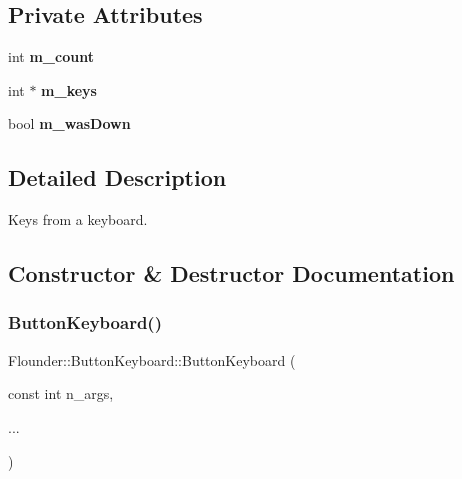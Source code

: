 \subsection*{Private Attributes}
\begin{DoxyCompactItemize}
\item 
\mbox{\label{class_flounder_1_1_button_keyboard_a335a1e9e818c4bd282ccd5f80289c6ba}} 
int {\bfseries m\+\_\+count}
\item 
\mbox{\label{class_flounder_1_1_button_keyboard_a2128f5dccbce2c0ecf4e7bab2db5297e}} 
int $\ast$ {\bfseries m\+\_\+keys}
\item 
\mbox{\label{class_flounder_1_1_button_keyboard_ab6263740a861aa751387a6136306e6db}} 
bool {\bfseries m\+\_\+was\+Down}
\end{DoxyCompactItemize}


\subsection{Detailed Description}
Keys from a keyboard. 



\subsection{Constructor \& Destructor Documentation}
\mbox{\label{class_flounder_1_1_button_keyboard_af280179504f2ac8f83821ac24161635a}} 
\subsubsection{\texorpdfstring{Button\+Keyboard()}{ButtonKeyboard()}}
{\footnotesize\ttfamily Flounder\+::\+Button\+Keyboard\+::\+Button\+Keyboard (\begin{DoxyParamCaption}\item[{const int}]{n\+\_\+args,  }\item[{}]{... }\end{DoxyParamCaption})}



